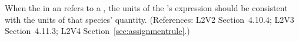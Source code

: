 When the  in an \InitialAssignment refers to a \Species,
the units of the \InitialAssignment's  expression should be
consistent with the units of that species' quantity.  (References:
L2V2 Section~4.10.4; L2V3 Section~4.11.3; L2V4 Section~\ref{sec:assignmentrule}.)
